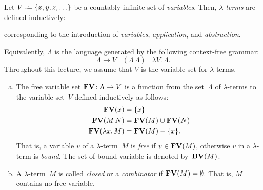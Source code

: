 \begin{definition}[Syntax]
  Let $V \defeq \{ x, y, z, \ldots \}$ be a countably infinite set of
  \emph{variables}.  Then, \emph{$\lambda$-terms} are defined inductively:
  \begin{multicols}{3}
    \begin{prooftree}
    \end{prooftree}
    \columnbreak
    \begin{prooftree}
    \end{prooftree}
    \columnbreak
    \begin{prooftree}
    \end{prooftree}
  \end{multicols}
  \noindent corresponding to the introduction of \emph{variables},
  \emph{application}, and \emph{abstraction}.
\end{definition}
Equivalently, $\Lambda$ is the language generated by the following
context-free grammar:
\[
\Lambda \longrightarrow V \mid (\Lambda\, \Lambda) \mid \lambda V.\, \Lambda.
\]
Throughout this lecture, we assume that $V$ is the variable set for
$\lambda$-terms. 
\begin{definition}
  \begin{enumerate}[(a)]
    \item The free variable set $\FV\colon \Lambda \to V$ is a function from the
      set~$\Lambda$ of $\lambda$-terms to the variable set~$V$ defined
      inductively as follows:
      \begin{align*}
        \FV(x) & = \{ x \} \\
        \FV(M\, N) & = \FV(M) \cup \FV(N) \\
        \FV(\lambda x.\, M) & = \FV(M) - \{ x \}.
      \end{align*}
      That is, a variable $v$ of a $\lambda$-term~$M$ is \emph{free} if $v \in
      \FV(M)$, otherwise $v$ in a $\lambda$-term is
      \emph{bound}. The set of bound variable is denoted by~$\BV(M)$.
    \item A $\lambda$-term~$M$ is called \emph{closed} or a \emph{combinator} if
      $\FV(M) = \emptyset$. That
      is, $M$ contains no free variable.
  \end{enumerate}
\end{definition}

